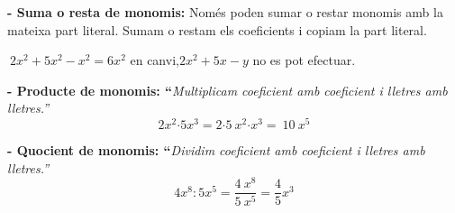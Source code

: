 \begin{theorybox}


 \textbf{- Suma o resta de monomis:}           Només poden sumar o restar monomis amb la mateixa part literal. Sumam o restam els coeficients i copiam la part literal.

\begin{center}
	$\ 2x^2+5x^2-x^2=6x^2$    \quad\quad en canvi,\quad\quad    $2x^2+5x-y$  no es pot efectuar.
\end{center}
\vspace{0.25cm}

\textbf{- Producte de monomis: ``}\textit{Multiplicam coeficient amb coeficient i lletres amb lletres.''} 
\[2x^2\textrm{·}5x^3=2\textrm{·}5\ x^2\textrm{·}x^3=\ 10\ x^5\] 


\textbf{- Quocient de monomis: ``}\textit{Dividim coeficient amb coeficient i lletres amb lletres.''} 
\[4x^8:5x^5=\frac{4\ x^8}{5\ x^5}=\frac{4}{5}x^3\] 
\end{theorybox}

